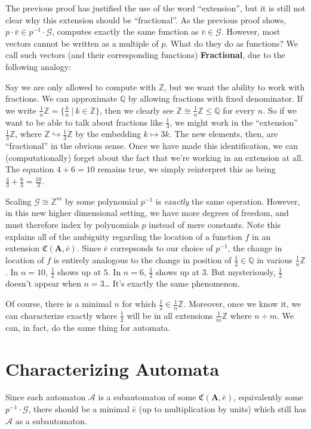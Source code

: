 \documentclass[runningheads]{llncs}
\newcommand{\A}{\mathcal{A}}
\newcommand{\G}{\mathcal{G}}
\newcommand{\C}{\mathfrak{C}(\Am,\e)}
\newcommand{\Z}{\mathbb{Z}}
\newcommand{\Q}{\mathbb{Q}}
\newcommand{\2}{\textbf{2}}
\newcommand{\Am}{\textbf{A}}
\newcommand{\vv}{\bar{v}}
\newcommand{\e}{\bar{e}}
\begin{document}
The previous proof has justified the use of the word ``extension'', 
but it is still not clear why this extension should be ``fractional''.
As the previous proof shows, $p \cdot \vv \in p^{-1} \cdot \G$, 
computes exactly the same function as $\vv \in \G$.
However, most vectors cannot be written as a multiple of $p$.
What do they do as functions?
We call such vectors (and their corresponding functions)
\textbf{Fractional}, due to the following analogy:

Say we are only allowed to compute with $\Z$, but we want the ability
to work with fractions. We can approximate $\Q$ by allowing fractions
with fixed denominator. If we write 
$\frac{1}{n} \mathbb{Z} = \{ \frac{k}{n} ~|~ k \in \Z \}$, 
then we clearly see $\Z \cong \frac{1}{n} \Z \leq \Q$ for every $n$. 
So if we want to be able to talk about fractions like 
$\frac{1}{3}$, we might work in the ``extension'' $\frac{1}{3} \Z$, where 
$\Z \hookrightarrow \frac{1}{3}\Z$ by the embedding $k \mapsto 3k$.
The new elements, then, are ``fractional'' in the obvious sense. 
Once we have made this identification, we can (computationally) forget
about the fact that we're working in an extension at all. The equation
$4 + 6 = 10$ remains true, we simply reinterpret this as being 
$\frac{4}{3} + \frac{6}{3} = \frac{10}{3}$. 

Scaling $\G \cong \Z^m$ by some polynomial $p^{-1}$ is \emph{exactly} the
same operation. However, in this new higher dimensional setting, we have 
more degrees of freedom, and must therefore index by polynomials $p$ instead
of mere constants. Note this explains all of the ambiguity regarding the
location of a function $f$ in an extension $\C$. Since $\e$ correpsonds to
our choice of $p^{-1}$, the change in location of $f$ is entirely analogous
to the change in position of $\frac{1}{2} \in \Q$ in various $\frac{1}{n}\Z$.
In $n=10$, $\frac{1}{2}$ shows up at $5$. In $n=6$, $\frac{1}{2}$ shows up 
at $3$. But mysteriously, $\frac{1}{2}$ doesn't appear when $n=3$\ldots
It's exactly the same phenomenon.

Of course, there is a minimal $n$ for which $\frac{1}{2} \in \frac{1}{n}\Z$.
Moreover, once we know it, we can characterize exactly where $\frac{1}{2}$
will be in all extensions $\frac{1}{m}\Z$ where $n \div m$. We can, in fact,
do the same thing for automata.

\section{Characterizing Automata}
Since each automaton $\A$ is a subautomaton of some $\C$,
equivalently some $p^{-1} \cdot \G$, there should be a minimal $\e$ 
(up to multiplication by units) which still has $\A$ as a subautomaton. 
\end{document}
